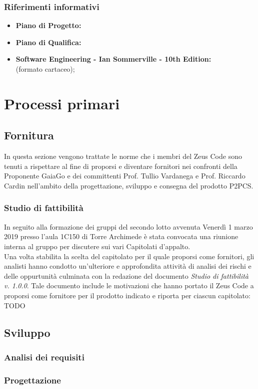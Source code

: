 \subsubsection {Riferimenti informativi}
\begin{itemize}
	\item \textbf{Piano di Progetto:}
	\item \textbf{Piano di Qualifica:}
	\item \textbf{Software Engineering - Ian Sommerville - 10th Edition: \\}(formato cartaceo);
\end{itemize}
\section {Processi primari}
\subsection {Fornitura}
In questa sezione vengono trattate le norme che i membri del Zeus Code sono tenuti a rispettare al fine di proporsi e diventare fornitori nei confronti della Proponente GaiaGo e dei committenti Prof. Tullio Vardanega e Prof. Riccardo Cardin nell'ambito della progettazione, sviluppo e consegna del prodotto P2PCS.
\subsubsection {Studio di fattibilità}
In seguito alla formazione dei gruppi del secondo lotto avvenuta Venerdì 1 marzo 2019 presso l'aula 1C150 di Torre Archimede è stata convocata una riunione interna al gruppo per discutere sui vari Capitolati d'appalto. \\ Una volta stabilita la scelta del capitolato per il quale proporsi come fornitori, gli analisti hanno condotto un'ulteriore e approfondita attività di analisi dei rischi e delle oppurtunità culminata con la redazione del documento \textit{Studio di fattibilità v. 1.0.0}. Tale documento include le motivazioni che hanno portato il Zeus Code a proporsi come fornitore per il prodotto indicato e riporta per ciascun capitolato: TODO
\subsection {Sviluppo}
\subsubsection {Analisi dei requisiti}
\subsubsection {Progettazione}
